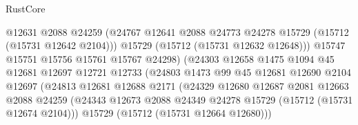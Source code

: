 \begin{lexlean}{RustCore}
\begin{coremodule}
                                      @12631
                                      @2088
                                      @24259
                                      (@24767
                                        @12641
                                        @2088
                                        @24773
                                        @24278
                                        @15729
                                        (@15712 (@15731 @12642 @2104)))
                                      @15729
                                      (@15712 (@15731 @12632 @12648)))
                                    @15747
                                    @15751
                                    @15756
                                    @15761
                                    @15767
                                    @24298)
                                  (@24303
                                    @12658
                                    @1475
                                    @1094
                                    @45
                                    @12681
                                    @12697
                                    @12721
                                    @12733
                                    (@24803
                                      @1473
                                      @99
                                      @45
                                      @12681
                                      @12690
                                      @2104
                                      @12697
                                      (@24813
                                        @12681
                                        @12688
                                        @2171
                                        (@24329
                                          @12680
                                          @12687
                                          @2081
                                          @12663
                                          @2088
                                          @24259
                                          (@24343
                                            @12673
                                            @2088
                                            @24349
                                            @24278
                                            @15729
                                            (@15712 (@15731 @12674 @2104)))
                                          @15729
                                          (@15712 (@15731 @12664 @12680)))

\end{coremodule}
\end{lexlean}
